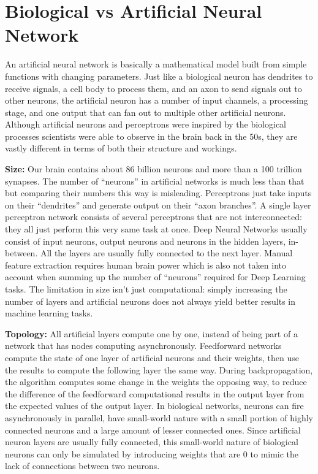  \section{Biological vs Artificial Neural Network}
An artificial neural network is basically a mathematical model built from simple functions with changing parameters. Just like a biological neuron has dendrites to receive signals, a cell body to process them, and an axon to send signals out to other neurons, the artificial neuron has a number of input channels, a processing stage, and one output that can fan out to multiple other artificial neurons. Although artificial neurons and perceptrons were inspired by the biological processes scientists were able to observe in the brain back in the 50s, they are vastly different in terms of both their structure and workings.

\textbf{Size:} Our brain contains about 86 billion neurons and more than a 100 trillion synapses. The number of “neurons” in artificial networks is much less than that but comparing their numbers this way is misleading. Perceptrons just take inputs on their “dendrites” and generate output on their “axon branches”. A single layer perceptron network consists of several perceptrons that are not interconnected: they all just perform this very same task at once. Deep Neural Networks usually consist of input neurons, output neurons and neurons in the hidden layers, in-between. All the layers are usually fully connected to the next layer. Manual feature extraction requires human brain power which is also not taken into account when summing up the number of “neurons” required for Deep Learning tasks. The limitation in size isn’t just computational: simply increasing the number of layers and artificial neurons does not always yield better results in machine learning tasks.

\textbf{Topology:} All artificial layers compute one by one, instead of being part of a network that has nodes computing asynchronously. Feedforward networks compute the state of one layer of artificial neurons and their weights, then use the results to compute the following layer the same way. During backpropagation, the algorithm computes some change in the weights the opposing way, to reduce the difference of the feedforward computational results in the output layer from the expected values of the output layer. In biological networks, neurons can fire asynchronously in parallel, have small-world nature with a small portion of highly connected neurons and a large amount of lesser connected ones. Since artificial neuron layers are usually fully connected, this small-world nature of biological neurons can only be simulated by introducing weights that are 0 to mimic the lack of connections between two neurons.

